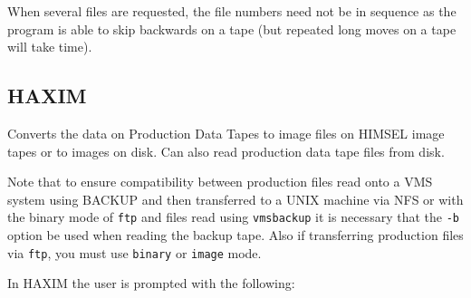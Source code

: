 When several files are requested, the file numbers need not be in
sequence as the program is able to skip backwards on a tape (but
repeated long moves on a tape will take time).

\subsection{HAXIM}
\label{HAXIM}

Converts the data on Production Data Tapes to image files on HIMSEL
image tapes or to images on disk.  Can also read production data tape
files from disk.

Note that to ensure compatibility between production files read onto a
VMS system using BACKUP and then transferred to a UNIX machine via NFS
or with the binary mode of \verb!ftp! and files read using
\verb!vmsbackup! it is necessary that the \verb!-b! option be used when
reading the backup tape. Also if transferring production files via
\verb!ftp!, you must use \verb!binary! or \verb!image! mode.

In HAXIM the user is prompted with the following:

